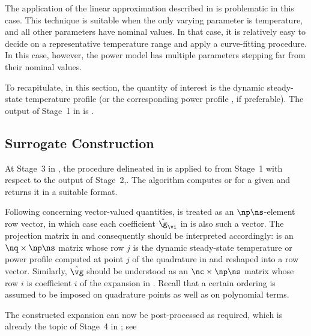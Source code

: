 \begin{remark}
The application of the linear approximation described in
 is problematic in this case. This technique
is suitable when the only varying parameter is temperature, and all other
parameters have nominal values. In that case, it is relatively easy to decide on
a representative temperature range and apply a curve-fitting procedure. In this
case, however, the power model has multiple parameters stepping far from their
nominal values.
\end{remark}

To recapitulate, in this section, the quantity of interest \g is the dynamic
steady-state temperature profile \mq (or the corresponding power profile \mp, if
preferable). The output of Stage~1 in  is
.

\subsection{Surrogate Construction}

At Stage~3 in , the procedure delineated in
 is applied to
 from Stage~1 with respect to the
output of Stage~2,. The algorithm computes \mp or \mq for a given \vu and
returns it in a suitable format.

Following  concerning vector-valued
quantities, \g is treated as an $\np \ns$-element row vector, in which case each
coefficient $\hat{\g}_{\vi}$ in  is also such a vector.
The projection matrix in  and consequently
 should be interpreted accordingly: \vg is an $\nq
\times \np \ns$ matrix whose row $j$ is the dynamic steady-state temperature or
power profile computed at point $j$ of the quadrature in
 and reshaped into a row vector. Similarly, $\hat{\vg}$
should be understood as an $\nc \times \np \ns$ matrix whose row $i$ is
coefficient $i$ of the expansion in . Recall that a
certain ordering is assumed to be imposed on quadrature points as well as on
polynomial terms.

The constructed expansion can now be post-processed as required, which is
already the topic of Stage~4 in ; see
